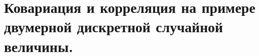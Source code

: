 \documentclass[polytech/stats/exam-2023/stats-exam-2023.tex]{subfiles}
\begin{document}
\section{Ковариация и корреляция на примере двумерной дискретной случайной величины.}
\end{document}
